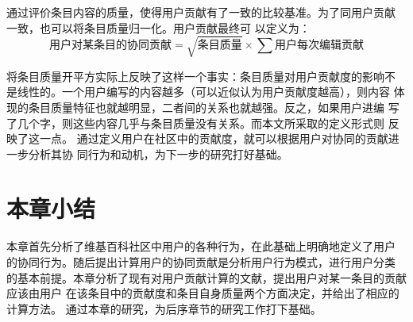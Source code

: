 通过评价条目内容的质量，使得用户贡献有了一致的比较基准。为了同用户贡献
一致，也可以将条目质量归一化。用户贡献最终可
以定义为：
\[
\text{用户对某条目的协同贡献}=\sqrt{\text{条目质量}} \times  \sum
\text{用户每次编辑贡献}
\]

将条目质量开平方实际上反映了这样一个事实：条目质量对用户贡献度的影响不
是线性的。一个用户编写的内容越多（可以近似认为用户贡献度越高），则内容
体现的条目质量特征也就越明显，二者间的关系也就越强。反之，如果用户进编
写了几个字，则这些内容几乎与条目质量没有关系。而本文所采取的定义形式则
反映了这一点。
通过定义用户在社区中的贡献度，就可以根据用户对协同的贡献进一步分析其协
同行为和动机，为下一步的研究打好基础。




\section*{本章小结}
本章首先分析了维基百科社区中用户的各种行为，在此基础上明确地定义了用户
的协同行为。随后提出计算用户的协同贡献是分析用户行为模式，进行用户分类
的基本前提。本章分析了现有对用户贡献计算的文献，提出用户对某一条目的贡献应该由用户
在该条目中的贡献度和条目自身质量两个方面决定，并给出了相应的计算方法。
通过本章的研究，为后序章节的研究工作打下基础。


